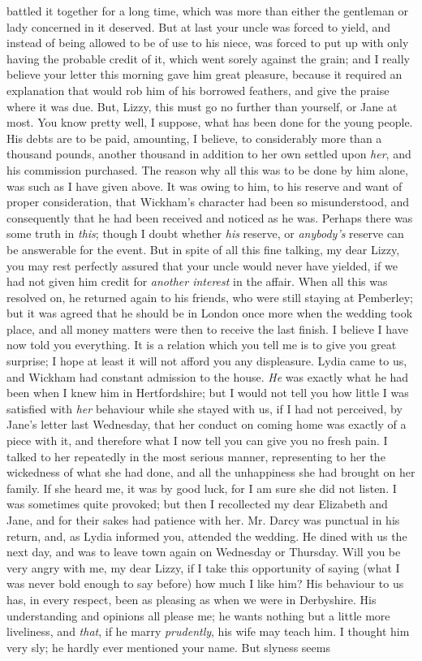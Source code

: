 battled it together for a long time, which was more than either the gentleman or lady concerned in it deserved. But at last your uncle was forced to yield, and instead of being allowed to be of use to his niece, was forced to put up with only having the probable credit of it, which went sorely against the grain; and I really believe your letter this morning gave him great pleasure, because it required an explanation that would rob him of his borrowed feathers, and give the praise where it was due. But, Lizzy, this must go no further than yourself, or Jane at most. You know pretty well, I suppose, what has been done for the young people. His debts are to be paid, amounting, I believe, to considerably more than a thousand pounds, another thousand in addition to her own settled upon \textit{her}, and his commission purchased. The reason why all this was to be done by him alone, was such as I have given above. It was owing to him, to his reserve and want of proper consideration, that Wickham's character had been so misunderstood, and consequently that he had been received and noticed as he was. Perhaps there was some truth in \textit{this}; though I doubt whether \textit{his} reserve, or \textit{anybody's} reserve can be answerable for the event. But in spite of all this fine talking, my dear Lizzy, you may rest perfectly assured that your uncle would never have yielded, if we had not given him credit for \textit{another interest} in the affair. When all this was resolved on, he returned again to his friends, who were still staying at Pemberley; but it was agreed that he should be in London once more when the wedding took place, and all money matters were then to receive the last finish. I believe I have now told you everything. It is a relation which you tell me is to give you great surprise; I hope at least it will not afford you any displeasure. Lydia came to us, and Wickham had constant admission to the house. \textit{He} was exactly what he had been when I knew him in Hertfordshire; but I would not tell you how little I was satisfied with \textit{her} behaviour while she stayed with us, if I had not perceived, by Jane's letter last Wednesday, that her conduct on coming home was exactly of a piece with it, and therefore what I now tell you can give you no fresh pain. I talked to her repeatedly in the most serious manner, representing to her the wickedness of what she had done, and all the unhappiness she had brought on her family. If she heard me, it was by good luck, for I am sure she did not listen. I was sometimes quite provoked; but then I recollected my dear Elizabeth and Jane, and for their sakes had patience with her. Mr. Darcy was punctual in his return, and, as Lydia informed you, attended the wedding. He dined with us the next day, and was to leave town again on Wednesday or Thursday. Will you be very angry with me, my dear Lizzy, if I take this opportunity of saying (what I was never bold enough to say before) how much I like him? His behaviour to us has, in every respect, been as pleasing as when we were in Derbyshire. His understanding and opinions all please me; he wants nothing but a little more liveliness, and \textit{that}, if he marry \textit{prudently}, his wife may teach him. I thought him very sly; he hardly ever mentioned your name. But slyness seems 